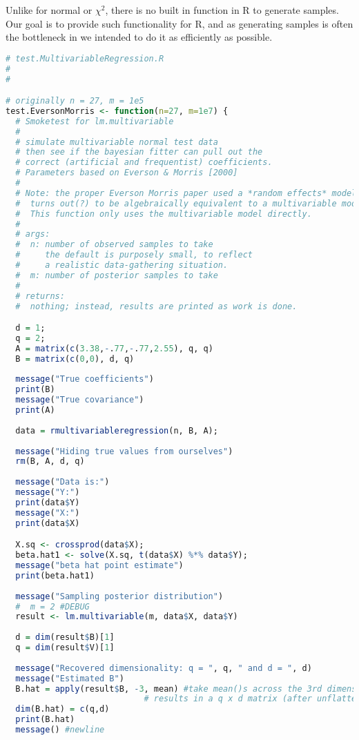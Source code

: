 \documentclass[english]{report}
\begin{document}
Unlike for normal or $\chi^2$, there is no built in function in R to generate samples. Our goal is to provide such functionality for R, and as generating samples is often the bottleneck in %
	we intended to do it as efficiently as possible.


\begin{lstlisting}[frame=single, language=R]
# test.MultivariableRegression.R
#
#

# originally n = 27, m = 1e5
test.EversonMorris <- function(n=27, m=1e7) {
  # Smoketest for lm.multivariable
  #
  # simulate multivariable normal test data
  # then see if the bayesian fitter can pull out the
  # correct (artificial and frequentist) coefficients.
  # Parameters based on Everson & Morris [2000]
  #
  # Note: the proper Everson Morris paper used a *random effects* model which
  #  turns out(?) to be algebraically equivalent to a multivariable model.
  #  This function only uses the multivariable model directly.
  #
  # args:
  #  n: number of observed samples to take
  #     the default is purposely small, to reflect
  #     a realistic data-gathering situation.
  #  m: number of posterior samples to take
  #
  # returns:
  #  nothing; instead, results are printed as work is done.

  d = 1;
  q = 2;
  A = matrix(c(3.38,-.77,-.77,2.55), q, q)
  B = matrix(c(0,0), d, q)
	
  message("True coefficients")
  print(B)
  message("True covariance")
  print(A)
  
  data = rmultivariableregression(n, B, A);
  
  message("Hiding true values from ourselves")
  rm(B, A, d, q)
  
  message("Data is:")
  message("Y:")
  print(data$Y)
  message("X:")
  print(data$X)

  X.sq <- crossprod(data$X);
  beta.hat1 <- solve(X.sq, t(data$X) %*% data$Y);
  message("beta hat point estimate")
  print(beta.hat1)
  
  message("Sampling posterior distribution")
  #  m = 2 #DEBUG
  result <- lm.multivariable(m, data$X, data$Y)
 
  d = dim(result$B)[1]
  q = dim(result$V)[1]
  
  message("Recovered dimensionality: q = ", q, " and d = ", d)
  message("Estimated B")
  B.hat = apply(result$B, -3, mean) #take mean()s across the 3rd dimension;
                            # results in a q x d matrix (after unflattening apply's results)
  dim(B.hat) = c(q,d)
  print(B.hat)
  message() #newline


\end{lstlisting}
\end{document}
